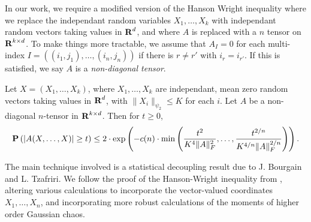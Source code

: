 In our work, we require a modified version of the Hanson Wright inequality where we replace the independant random variables $X_1, \dots, X_k$ with independant random vectors taking values in $\operatorname{\mathbf{R}}^d$, and where $A$ is replaced with a $n$ tensor on $\operatorname{\mathbf{R}}^{k \times d}$. To make things more tractable, we assume that $A_I = 0$ for each multi-index $I = ((i_1,j_1), \dots, (i_n,j_n))$ if there is $r \neq r'$ with $i_r = i_{r'}$. If this is satisfied, we say $A$ is a \emph{non-diagonal tensor}.

\begin{theorem}
	Let $X = (X_1, \dots, X_k)$, where $X_1, \dots, X_k$ are independant, mean zero random vectors taking values in $\operatorname{\mathbf{R}}^d$, with $\| X_i \|_{\psi_2} \leq K$ for each $i$. Let $A$ be a non-diagonal $n$-tensor in $\operatorname{\mathbf{R}}^{k \times d}$. Then for $t \geq 0$,
	\[ \operatorname{\mathbf{P}} \left( |A(X,\dots,X)| \geq t \right) \leq 2 \cdot \exp \left( - c(n) \cdot \min \left( \frac{t^2}{K^4 \| A \|_F^2}, \dots, \frac{t^{2/n}}{K^{4/n} \| A \|_F^{2/n}} \right) \right). \]
\end{theorem}

The main technique involved is a statistical decoupling result due to J. Bourgain and L. Tzafriri. We follow the proof of the Hanson-Wright inequality from \cite{Vershynin}, altering various calculations to incorporate the vector-valued coordinates $X_1, \dots, X_n$, and incorporating more robust calculations of the moments of higher order Gaussian chaos.

